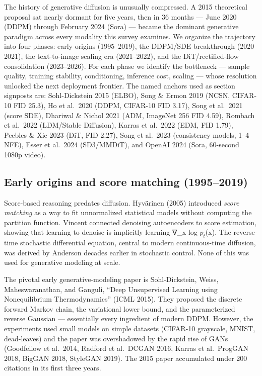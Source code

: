\documentclass{article}
\begin{document}
The history of generative diffusion is unusually compressed. A 2015 theoretical proposal sat nearly dormant for five years, then in 36 months --- June 2020 (DDPM) through February 2024 (Sora) --- became the dominant generative paradigm across every modality this survey examines. We organize the trajectory into four phases: early origins (1995--2019), the DDPM/SDE breakthrough (2020--2021), the text-to-image scaling era (2021--2022), and the DiT/rectified-flow consolidation (2023--2026). For each phase we identify the bottleneck --- sample quality, training stability, conditioning, inference cost, scaling --- whose resolution unlocked the next deployment frontier. The named anchors used as section signposts are: Sohl-Dickstein 2015 (ELBO), Song \& Ermon 2019 (NCSN, CIFAR-10 FID 25.3), Ho et al.~2020 (DDPM, CIFAR-10 FID 3.17), Song et al.~2021 (score SDE), Dhariwal \& Nichol 2021 (ADM, ImageNet 256 FID 4.59), Rombach et al.~2022 (LDM/Stable Diffusion), Karras et al.~2022 (EDM, FID 1.79), Peebles \& Xie 2023 (DiT, FID 2.27), Song et al.~2023 (consistency models, 1--4 NFE), Esser et al.~2024 (SD3/MMDiT), and OpenAI 2024 (Sora, 60-second 1080p video).

\subsection{Early origins and score matching (1995--2019)}\label{early-origins-and-score-matching-19952019}

Score-based reasoning predates diffusion. Hyvärinen (2005) introduced \emph{score matching} as a way to fit unnormalized statistical models without computing the partition function. Vincent \citet{vincent2011aconnectionbetween} connected denoising autoencoders to score estimation, showing that learning to denoise is implicitly learning ∇\_x log \(p_t\)(x). The reverse-time stochastic differential equation, central to modern continuous-time diffusion, was derived by Anderson \citet{anderson1982reversetimestochas} decades earlier in stochastic control. None of this was used for generative modeling at scale.

The pivotal early generative-modeling paper is Sohl-Dickstein, Weiss, Maheswaranathan, and Ganguli, ``Deep Unsupervised Learning using Nonequilibrium Thermodynamics'' (ICML 2015). They proposed the discrete forward Markov chain, the variational lower bound, and the parameterized reverse Gaussian --- essentially every ingredient of modern DDPM. However, the experiments used small models on simple datasets (CIFAR-10 grayscale, MNIST, dead-leaves) and the paper was overshadowed by the rapid rise of GANs (Goodfellow et al.~2014, Radford et al.~DCGAN 2016, Karras et al.~ProgGAN 2018, BigGAN 2018, StyleGAN 2019). The 2015 paper accumulated under 200 citations in its first three years.
\end{document}
